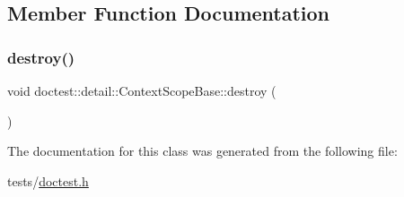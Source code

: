\subsection{Member Function Documentation}
\mbox{\label{classdoctest_1_1detail_1_1ContextScopeBase_a6f223de9a972b08bf1b9e9d2d99ab4c6}} 
\subsubsection{\texorpdfstring{destroy()}{destroy()}}
{\footnotesize\ttfamily void doctest\+::detail\+::\+Context\+Scope\+Base\+::destroy (\begin{DoxyParamCaption}{ }\end{DoxyParamCaption})\hspace{0.3cm}{\ttfamily [protected]}}



The documentation for this class was generated from the following file\+:\begin{DoxyCompactItemize}
\item 
tests/\hyperlink{doctest_8h}{doctest.\+h}\end{DoxyCompactItemize}
